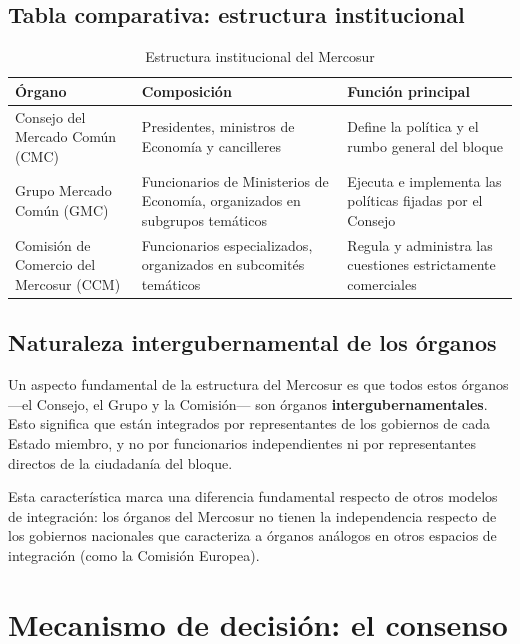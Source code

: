 \documentclass[12pt,oneside]{book}
\begin{document}
\section{Tabla comparativa: estructura institucional}

\begin{table}[H]
\centering
\begin{tabularx}{\textwidth}{
    >{\raggedright\arraybackslash}p{}
    >{\raggedright\arraybackslash}X
    >{\raggedright\arraybackslash}X
}
\toprule
\textbf{Órgano} & \textbf{Composición} & \textbf{Función principal} \\
\midrule
Consejo del Mercado Común (CMC) & Presidentes, ministros de Economía y cancilleres & Define la política y el rumbo general del bloque \\
Grupo Mercado Común (GMC) & Funcionarios de Ministerios de Economía, organizados en subgrupos temáticos & Ejecuta e implementa las políticas fijadas por el Consejo \\
Comisión de Comercio del Mercosur (CCM) & Funcionarios especializados, organizados en subcomités temáticos & Regula y administra las cuestiones estrictamente comerciales \\
\bottomrule
\end{tabularx}
\caption{Estructura institucional del Mercosur}
\end{table}

\section{Naturaleza intergubernamental de los órganos}

Un aspecto fundamental de la estructura del Mercosur es que todos estos órganos —el Consejo, el Grupo y la Comisión— son órganos \textbf{intergubernamentales}. Esto significa que están integrados por representantes de los gobiernos de cada Estado miembro, y no por funcionarios independientes ni por representantes directos de la ciudadanía del bloque.

Esta característica marca una diferencia fundamental respecto de otros modelos de integración: los órganos del Mercosur no tienen la independencia respecto de los gobiernos nacionales que caracteriza a órganos análogos en otros espacios de integración (como la Comisión Europea).

\chapter{Mecanismo de decisión: el consenso}
\end{document}
